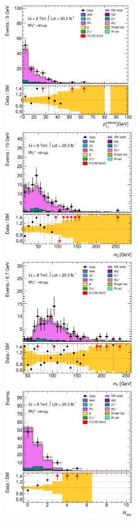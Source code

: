 \begin{figure}[t]
	\includegraphics[width=0.495\textwidth]{tex/backgrounds/Wgstar/em_CutDPhiMax_lepPtSublead_zoom_mh125_lin}
	\hfill
	\includegraphics[width=0.495\textwidth]{tex/backgrounds/Wgstar/em_CutDPhiMax_Mll_mh125_lin}
	\\
	\includegraphics[width=0.495\textwidth]{tex/backgrounds/Wgstar/em_CutDPhiMax_MT_TrackHWW_Clj_mh125_lin}
	\hfill
	\includegraphics[width=0.495\textwidth]{tex/backgrounds/Wgstar/em_CutDPhiMax_m_jet_n_mh125_lin}

\end{figure}
